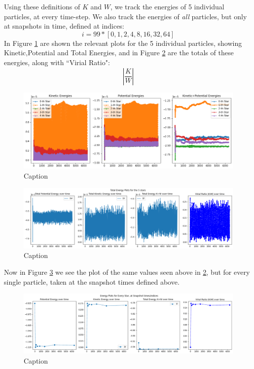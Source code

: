 \documentclass[oneside]{book}
\begin{document}
Using these definitions of $K$ and $W$, we track the energies of 5 individual particles, at every time-step. We also track the energies of \textit{all} particles, but only at snapshots in time, defined at indices:
$$i = 99*[0,1,2,4,8,16,32,64]$$
In Figure \ref{5Stars Inidivual} are shown the relevant plots for the 5 individual particles, showing Kinetic,Potential and Total Energies, and in Figure \ref{5Stars Total} are the totals of these energies, along with ``Virial Ratio":
\begin{equation}
    \left|\frac{K}{W}\right|
\end{equation}
\begin{figure}[h]
    \centering
    \includegraphics[width=\textwidth]{Images/5Stars_Individual.png}
    \caption{Caption}
    \label{5Stars Inidivual}
\end{figure}

\begin{figure}[h]
    \centering
    \includegraphics[width=\textwidth]{Images/5Stars_Total.png}
    \caption{Caption}
    \label{5Stars Total}
\end{figure}

Now in Figure \ref{All Total Energies} we see the plot of the same values seen above in  \ref{5Stars Total}, but for every single particle, taken at the snapshot times defined above.
\begin{figure}[h]
    \centering
    \includegraphics[width=\textwidth]{Images/AllTotal.png}
    \caption{Caption}
    \label{All Total Energies}
\end{figure}
\end{document}
